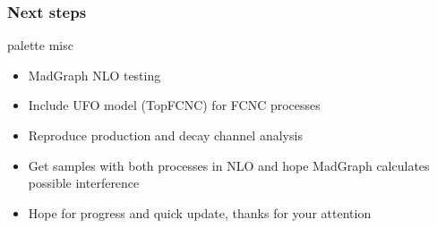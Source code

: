 \documentclass{beamer}
\begin{document}
\begin{frame}[fragile]
\frametitle{Next steps}
\begin{beamercolorbox}[rounded=true,shadow=true]{palette misc}
	\begin{itemize}
		\item MadGraph NLO testing
		\item Include UFO model (TopFCNC) for FCNC processes
		\item Reproduce production and decay channel analysis
		\item Get samples with both processes in NLO and hope MadGraph calculates possible interference
		\item Hope for progress and quick update, thanks for your attention
	\end{itemize}
\end{beamercolorbox}
\end{frame}
\end{document}
